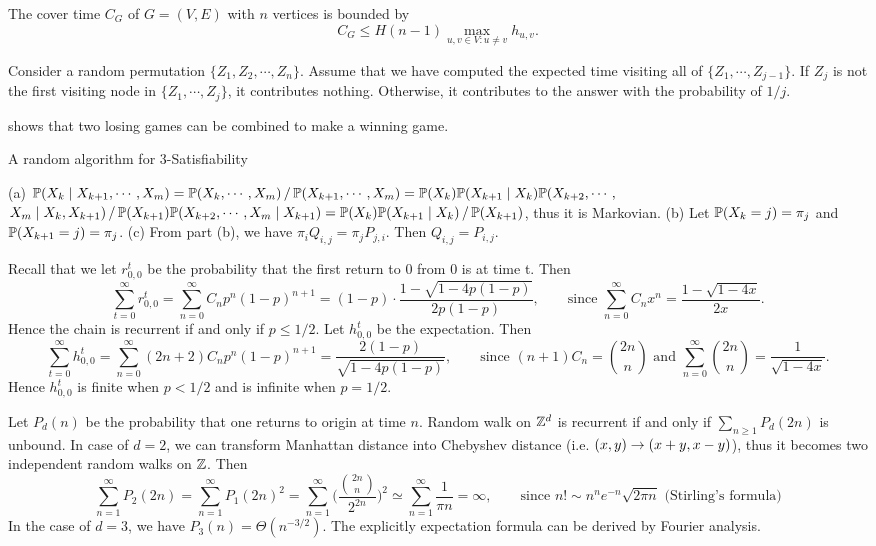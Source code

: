 \documentclass[main.tex]{subfiles}
\begin{document}
\begin{theorem}
	The cover time $C_G$ of $G=(V,E)$ with $n$ vertices is bounded by
	\[C_G\le H(n-1)\max_{u,v\in V: u\not=v}h_{u,v}.\]
\end{theorem}

\begin{pf}
	Consider a random permutation $\{Z_1,Z_2,\cdots,Z_n\}$. Assume that we have computed the expected time visiting all of $\{Z_1,\cdots, Z_{j-1}\}$. If $Z_j$ is not the first visiting node in $\{Z_1,\cdots, Z_j\}$, it contributes nothing. Otherwise, it contributes to the answer with the probability of $1/j$.
\end{pf}

 shows that two losing games can be combined to make a winning game.

\bigskip

{\bs A random algorithm for 3-Satisfiability}

\bigskip

 (a) $\mathbb{P}(X_k\mid X_{k+1},\cdots,X_m) = \mathbb{P}(X_k,\cdots,X_m) \,/\, \mathbb{P}(X_{k+1},\cdots,X_m) = \mathbb{P}(X_k) \mathbb{P}(X_{k+1} \mid X_{k}) \mathbb{P}(X_{k+2},\cdots,$ $X_{m} \mid X_{k}, X_{k+1}) \,/\, \mathbb{P}(X_{k+1}) \mathbb{P}(X_{k+2},\cdots,X_{m} \mid X_{k+1}) = \mathbb{P}(X_k) \mathbb{P}(X_{k+1} \mid X_k) \,/\, \mathbb{P}(X_{k+1})$, thus it is Markovian. (b) Let $\mathbb{P}(X_k=j)=\pi_j$ and $\mathbb{P}(X_{k+1}=j)=\pi_j$. (c) From part (b), we have $\pi_i Q_{i,j} = \pi_j P_{j,i}$. Then $Q_{i,j} = P_{i,j}$.

 Recall that we let $r^t_{0,0}$ be the probability that the first return to 0 from 0 is at time t. Then
\[\sum_{t=0}^{\infty} r^t_{0,0} = \sum_{n=0}^{\infty}C_np^n(1-p)^{n+1}=(1-p)\cdot \frac{1-\sqrt{1-4p(1-p)}}{2p(1-p)},\qquad \text{since } \sum_{n=0}^{\infty} C_n x^n = \frac{1-\sqrt{1-4x}}{2x}.\]
Hence the chain is recurrent if and only if $p\le 1/2$. Let $h^t_{0,0}$ be the expectation. Then
\[\sum_{t=0}^{\infty} h^t_{0,0} = \sum_{n=0}^{\infty}(2n+2)C_np^n(1-p)^{n+1}=\frac{2(1-p)}{\sqrt{1-4p(1-p)}},\qquad \text{since }(n+1)C_n=\binom{2n}{n} \text{ and } \sum_{n=0}^{\infty}\binom{2n}{n} = \frac{1}{\sqrt{1-4x}}.\]
Hence $h^t_{0,0}$ is finite when $p < 1/2$ and is infinite when $p = 1/2$.

  Let $P_d(n)$ be the probability that one returns to origin at time $n$. Random walk on $\mathbb{Z}^d$ is recurrent if and only if $\sum_{n\ge 1}P_d(2n)$ is unbound. In case of $d=2$, we can transform Manhattan distance into Chebyshev distance (i.e. $(x,y)\rightarrow(x+y,x-y)$), thus it becomes two independent random walks on $\mathbb{Z}$. Then
\[
	\sum_{n=1}^{\infty}P_2(2n)=\sum_{n=1}^{\infty}P_1(2n)^2=\sum_{n=1}^{\infty}\biggl(\frac{\binom{2n}{n}}{2^{2n}}\biggr)^2\simeq\sum_{n=1}^{\infty}\frac{1}{\pi n} = \infty,\qquad \text{since }n!\sim n^ne^{-n}\sqrt{2\pi n} \text{ (Stirling’s formula)}
\]
In the case of $d=3$, we have $P_3(n)=\Theta(n^{-3/2})$. The explicitly expectation formula can be derived by Fourier analysis.
\end{document}
